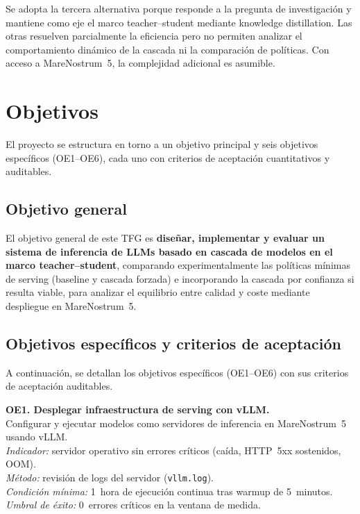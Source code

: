 \documentclass[11pt,a4paper]{article}
\begin{document}
Se adopta la tercera alternativa porque responde a la pregunta de investigación y mantiene como eje el marco teacher--student mediante knowledge distillation. Las otras resuelven parcialmente la eficiencia pero no permiten analizar el comportamiento dinámico de la cascada ni la comparación de políticas. Con acceso a MareNostrum~5, la complejidad adicional es asumible.

\section{Objetivos}

El proyecto se estructura en torno a un objetivo principal y seis objetivos específicos (OE1--OE6), cada uno con criterios de aceptación cuantitativos y auditables.

\subsection{Objetivo general}

El objetivo general de este TFG es \textbf{diseñar, implementar y evaluar un sistema de inferencia de LLMs basado en cascada de modelos en el marco teacher--student}, comparando experimentalmente las políticas mínimas de serving (baseline y cascada forzada) e incorporando la cascada por confianza si resulta viable, para analizar el equilibrio entre calidad y coste mediante despliegue en MareNostrum~5.

\subsection{Objetivos específicos y criterios de aceptación}

A continuación, se detallan los objetivos específicos (OE1--OE6) con sus criterios de aceptación auditables.

\textbf{OE1. Desplegar infraestructura de serving con vLLM.}\\
Configurar y ejecutar modelos como servidores de inferencia en MareNostrum~5 usando vLLM.\\
\textit{Indicador:} servidor operativo sin errores críticos (caída, HTTP~5xx sostenidos, OOM).\\
\textit{Método:} revisión de logs del servidor (\texttt{vllm.log}).\\
\textit{Condición mínima:} 1~hora de ejecución continua tras warmup de 5~minutos.\\
\textit{Umbral de éxito:} 0~errores críticos en la ventana de medida.
\end{document}
